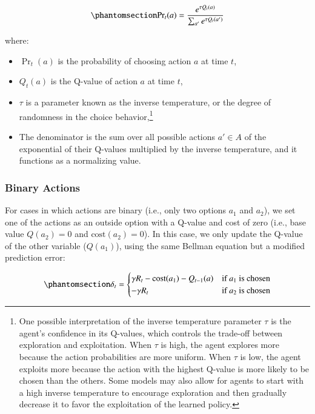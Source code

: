 \documentclass[
  number,
  preprint,
  3p,
  onecolumn]{elsarticle}
\begin{document}
\begin{equation}\phantomsection\label{eq-softmax}{
\text{Pr}_t(a) = \frac{e^{\tau Q_t(a)}}{\sum_{a'} e^{\tau Q_t(a')}}
}\end{equation}

where:

\begin{itemize}
\item
  \(\Pr_t(a)\) is the probability of choosing action \(a\) at time
  \(t\),
\item
  \(Q_t(a)\) is the Q-value of action \(a\) at time \(t\),
\item
  \(\tau\) is a parameter known as the inverse temperature, or the
  degree of randomness in the choice behavior,\footnote{One possible
    interpretation of the inverse temperature parameter \(\tau\) is the
    agent's confidence in its Q-values, which controls the trade-off
    between exploration and exploitation. When \(\tau\) is high, the
    agent explores more because the action probabilities are more
    uniform. When \(\tau\) is low, the agent exploits more because the
    action with the highest Q-value is more likely to be chosen than the
    others. Some models may also allow for agents to start with a high
    inverse temperature to encourage exploration and then gradually
    decrease it to favor the exploitation of the learned policy.}
\item
  The denominator is the sum over all possible actions \(a' \in A\) of
  the exponential of their Q-values multiplied by the inverse
  temperature, and it functions as a normalizing value.
\end{itemize}

\subsubsection{Binary Actions}\label{binary-actions}

For cases in which actions are binary (i.e., only two options \(a_1\)
and \(a_2\)), we set one of the actions as an outside option with a
Q-value and cost of zero (i.e., base value \(Q(a_2)=0\) and
\(\text{cost}(a_2)=0\)). In this case, we only update the Q-value of the
other variable (\(Q(a_1)\)), using the same Bellman equation but a
modified prediction error:

\begin{equation}\phantomsection\label{eq-state-free}{
\delta_t =
\begin{cases}
\gamma R_t - \text{cost}(a_1) - Q_{t-1}(a) & \text{if } a_1 \text{ is chosen} \\
-\gamma R_t & \text{if } a_2 \text{ is chosen}
\end{cases}
}\end{equation}
\end{document}
